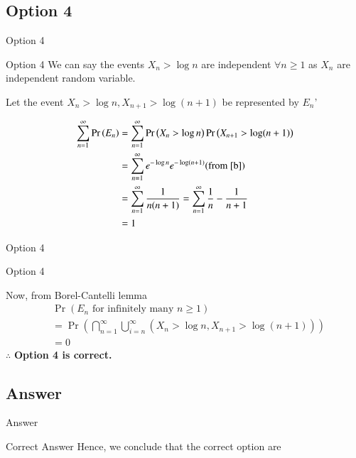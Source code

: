 \documentclass{beamer}
\providecommand{\pr}[1]{\ensuremath{\Pr\left(#1\right)}}
\providecommand{\pr}[1]{\ensuremath{\Pr\left(#1\right)}}
\providecommand{\brak}[1]{\ensuremath{\left(#1\right)}}
\theoremstyle{remark}
\numberwithin{equation}{subsection}
\begin{document}
\subsection{Option 4}
\begin{frame}{Option 4}
\begin{block}{Option 4}
 We can say the events $X_n>\log n$ are independent $\forall n\geq 1$ as $X_n$ are independent random variable.
    
    Let the event $X_n > \log n,X_{n+1}>\log (n+1)$ be represented by $E_n$'
    
    \begin{align}
        \sum_{n=1}^{\infty}\pr{E_n}
        &= \sum_{n=1}^{\infty}\pr{X_n>\log n}\pr{X_{n+1}>\log (n+1)}\nonumber\\
        &=\sum_{n=1}^{\infty}e^{-\log n}e^{-\log (n+1)}\text{(from \eqref{b})}\nonumber\\
        &=\sum_{n=1}^{\infty}\frac{1}{n(n+1)}=\sum_{n=1}^{\infty}\frac{1}{n}-\frac{1}{n+1}\nonumber\\
        &=1
    \end{align}
    
\end{block}
\end{frame}

\begin{frame}{Option 4}
\begin{block}{Option 4}

    Now, from Borel-Cantelli lemma
    \begin{align}
        &\pr{E_n\text{ for infinitely many }n\geq1}\nonumber\\
        &=\pr{\bigcap_{n=1}^{\infty}\bigcup_{i=n}^{\infty} \brak{X_n>\log n,X_{n+1}>\log (n+1)}}\nonumber\\
        &=0\nonumber
    \end{align}
    $\therefore$ \textbf{Option 4 is correct.}

\end{block}
\end{frame}


\subsection{Answer}

\begin{frame}{Answer}
\begin{block}{Correct Answer}
Hence, we conclude that the correct option are 


\end{block}
   
\end{frame}
\end{document}
